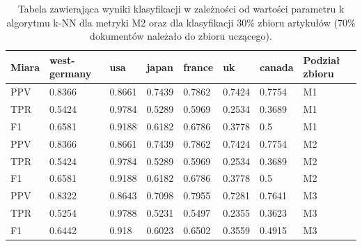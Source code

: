 \documentclass{classrep}
\begin{document}
\begin{table}[H]
    \centering
\caption{Tabela zawierająca wyniki klasyfikacji w zależności od wartości parametru k algorytmu k-NN dla metryki M2 oraz dla klasyfikacji 30\% zbioru artykułów (70\% dokumentów należało do zbioru uczącego).}
\begin{adjustbox}{max width=\textwidth}
    \begin{tabular}{|l|l|l|l|l|l|l|l|}
    \hline
        Miara & west-germany  & usa  & japan & france & uk & canada & Podział zbioru \\ \hline
        PPV & 0.8366 & 0.8661 & 0.7439 & 0.7862 & 0.7424 & 0.7754 & M1 \\ \hline
        TPR & 0.5424 & 0.9784 & 0.5289 & 0.5969 & 0.2534 & 0.3689 & M1 \\ \hline
        F1 & 0.6581 & 0.9188 & 0.6182 & 0.6786 & 0.3778 & 0.5 & M1 \\ \hline
        PPV & 0.8366 & 0.8661 & 0.7439 & 0.7862 & 0.7424 & 0.7754 & M2 \\ \hline
        TPR & 0.5424 & 0.9784 & 0.5289 & 0.5969 & 0.2534 & 0.3689 & M2 \\ \hline
        F1 & 0.6581 & 0.9188 & 0.6182 & 0.6786 & 0.3778 & 0.5 & M2 \\ \hline
        PPV & 0.8322 & 0.8643 & 0.7098 & 0.7955 & 0.7281 & 0.7641 & M3 \\ \hline
        TPR & 0.5254 & 0.9788 & 0.5231 & 0.5497 & 0.2355 & 0.3623 & M3 \\ \hline
        F1 & 0.6442 & 0.918 & 0.6023 & 0.6502 & 0.3559 & 0.4915 & M3 \\ \hline
    \end{tabular}
\end{adjustbox}
\end{table}
\end{document}
